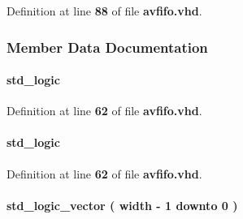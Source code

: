Definition at line {\bf 88} of file {\bf avfifo.\+vhd}.



\subsubsection{Member Data Documentation}
\paragraph[{fiford}]{ {\bfseries \textcolor{comment}{std\+\_\+logic}\textcolor{vhdlchar}{ }} \hspace{0.3cm}{\ttfamily [Signal]}}\label{classavfifo_1_1avfifo__arch_a009855f2c1d1da2a7b422e8cc93ed10a}


Definition at line {\bf 62} of file {\bf avfifo.\+vhd}.

\paragraph[{fiford\+\_\+reg}]{ {\bfseries \textcolor{comment}{std\+\_\+logic}\textcolor{vhdlchar}{ }} \hspace{0.3cm}{\ttfamily [Signal]}}\label{classavfifo_1_1avfifo__arch_a5386e215fc843128d61dd1fbd89bad42}


Definition at line {\bf 62} of file {\bf avfifo.\+vhd}.

\paragraph[{status\+\_\+reg}]{ {\bfseries \textcolor{comment}{std\+\_\+logic\+\_\+vector}\textcolor{vhdlchar}{ }\textcolor{vhdlchar}{(}\textcolor{vhdlchar}{ }\textcolor{vhdlchar}{ }\textcolor{vhdlchar}{ }\textcolor{vhdlchar}{ }{\bfseries {\bf width}} \textcolor{vhdlchar}{-\/}\textcolor{vhdlchar}{ } \textcolor{vhdldigit}{1} \textcolor{vhdlchar}{ }\textcolor{keywordflow}{downto}\textcolor{vhdlchar}{ }\textcolor{vhdlchar}{ } \textcolor{vhdldigit}{0} \textcolor{vhdlchar}{ }\textcolor{vhdlchar}{)}\textcolor{vhdlchar}{ }} \hspace{0.3cm}{\ttfamily [Signal]}}\label{classavfifo_1_1avfifo__arch_a8f28ae0242944eb4f6ec17c36b15a965}


